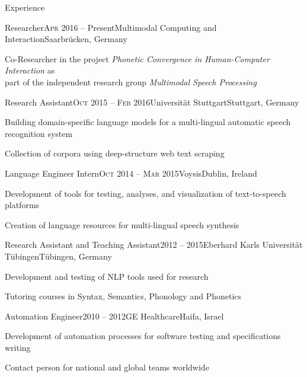 \documentclass{resume} %
\begin{document}
\begin{rSection}{Experience}

\begin{rSubsection}{Researcher}{\textsc{Apr} 2016 -- Present}{Multimodal Computing and Interaction}{Saarbrücken, Germany}
	\setlength{\itemindent}{.7cm}
	
	\item Co-Researcher in the project \textit{Phonetic Convergence in Human-Computer Interaction} as\\\hspace*{.7cm}part of the independent research group \textit{Multimodal Speech Processing}
	
\end{rSubsection}

\begin{rSubsection}{Research Assistant}{\textsc{Oct} 2015 -- \textsc{Feb} 2016}{Universität Stuttgart}{Stuttgart, Germany}
	\setlength{\itemindent}{.7cm}
	
	\item Building domain-specific language models for a multi-lingual automatic speech recognition system
	
	\item Collection of corpora using deep-structure web text scraping
\end{rSubsection}

\begin{rSubsection}{Language Engineer Intern}{\textsc{Oct} 2014 -- \textsc{Mar} 2015}{Voysis}{Dublin, Ireland}
	\setlength{\itemindent}{.7cm}

	\item Development of tools for testing, analyses, and visualization of text-to-speech platforms
	
	\item Creation of language resources for multi-lingual speech synthesis
\end{rSubsection}

\begin{rSubsection}{Research Assistant and Teaching Assistant}{2012 -- 2015}{Eberhard Karls Universität Tübingen}{Tübingen, Germany}
	\setlength{\itemindent}{.7cm}
	
	\item Development and testing of NLP tools used for research %
	
	\item Tutoring courses in Syntax, Semantics, Phonology and Phonetics %
\end{rSubsection}

\begin{rSubsection}{Automation Engineer}{2010 -- 2012}{GE Healthcare}{Haifa, Israel}
	\setlength{\itemindent}{.7cm}
	
	\item Development of automation processes for software testing and specifications writing
	
	\item Contact person for national and global teams worldwide 
\end{rSubsection}

\end{rSection}
\end{document}
